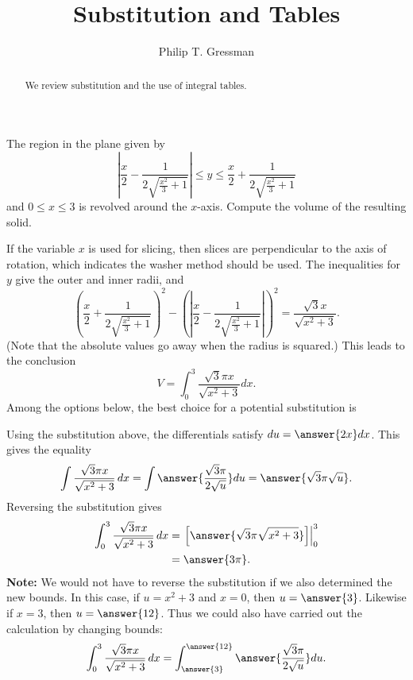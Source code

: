 \documentclass{ximera}
\title{Substitution and Tables}
\author{Philip T. Gressman}
\begin{document}
\begin{abstract}
We review substitution and the use of integral tables.
\end{abstract}
\maketitle

\begin{example}%
The region in the plane given by \[\left|{\frac{x}{2} - \frac{1}{2 \sqrt{\frac{x^{2}}{3} + 1}}}\right| \leq y \leq \frac{x}{2} + \frac{1}{2 \sqrt{\frac{x^{2}}{3} + 1}}\] and \(0 \leq x \leq 3\) is revolved around the \(x\)-axis. Compute the volume of the resulting solid.

If the variable \(x\) is used for slicing, then slices are perpendicular to the axis of rotation, which indicates the washer method should be used.
The inequalities for \(y\) give the outer and inner radii, and \[ \left(\frac{x}{2} + \frac{1}{2 \sqrt{\frac{x^{2}}{3} + 1}}\right)^2 - \left( \left|{\frac{x}{2} - \frac{1}{2 \sqrt{\frac{x^{2}}{3} + 1}}}\right|\right)^2 = \frac{\sqrt{3} x}{\sqrt{x^{2} + 3}}. \] (Note that the absolute values go away when the radius is squared.)
This leads to the conclusion
\[ V=  \int_{0}^{3} \frac{\sqrt{3} \pi x}{\sqrt{x^{2} + 3}} dx. \]
Among the options below, the best choice for a potential substitution is
\begin{multipleChoice}
\end{multipleChoice}
Using the substitution above, the differentials satisfy \(du = \answer{2x}dx\). This gives the equality
\[  \int \frac{\sqrt{3} \pi x}{\sqrt{x^{2} + 3}}\, dx  = \int \answer{\frac{\sqrt{3} \pi}{2 \sqrt{u}}} du = \answer{\sqrt{3} \pi \sqrt{u}}.  \]
Reversing the substitution gives
\[ \begin{aligned} \int_{0}^{3} \frac{\sqrt{3} \pi x}{\sqrt{x^{2} + 3}}\, dx & = \left. \left[\answer{\sqrt{3} \pi \sqrt{x^{2} + 3}} \right] \right|_{0}^{3}\\ & =  \answer{3 \pi}. \end{aligned} \]
\textbf{Note:} We would not have to reverse the substitution if we also determined the new bounds. In this case, if $u = x^2 + 3$ and $x = 0$, then $u = \answer{3}$. Likewise if $x = 3$, then $u = \answer{12}$. Thus we could also have carried out the calculation by changing bounds:
\[ \int_{0}^{3} \frac{\sqrt{3} \pi x}{\sqrt{x^{2} + 3}}\, dx = \int_{\answer{3}}^{\answer{12}} \answer{\frac{\sqrt{3} \pi}{2 \sqrt{u}}} du. \]
\end{example}
\end{document}
